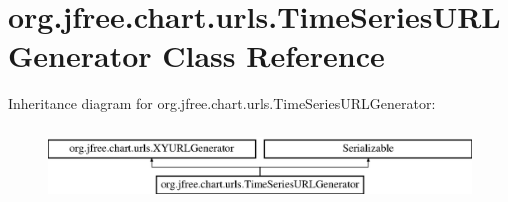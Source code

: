 \hypertarget{classorg_1_1jfree_1_1chart_1_1urls_1_1_time_series_u_r_l_generator}{}\section{org.\+jfree.\+chart.\+urls.\+Time\+Series\+U\+R\+L\+Generator Class Reference}
\label{classorg_1_1jfree_1_1chart_1_1urls_1_1_time_series_u_r_l_generator}
Inheritance diagram for org.\+jfree.\+chart.\+urls.\+Time\+Series\+U\+R\+L\+Generator\+:\begin{figure}[H]
\begin{center}
\leavevmode
\includegraphics[height=2.000000cm]{classorg_1_1jfree_1_1chart_1_1urls_1_1_time_series_u_r_l_generator}
\end{center}
\end{figure}
